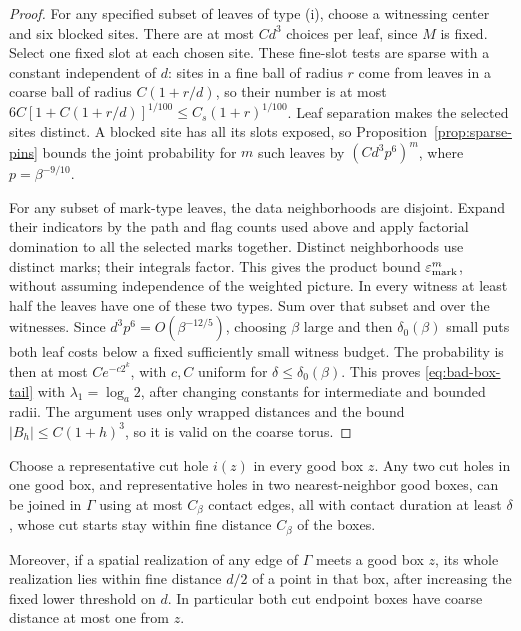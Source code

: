 \begin{proof}
For any specified subset of leaves of type (i), choose a witnessing
center and six blocked sites.  There are at most $Cd^3$ choices per
leaf, since $M$ is fixed.  Select one fixed slot at each chosen
site.  These fine-slot tests are sparse with a constant independent
of $d$: sites in a fine ball of radius $r$ come from leaves in a
coarse ball of radius $C(1+r/d)$, so their number is at most
$6C[1+C(1+r/d)]^{1/100}\le C_s(1+r)^{1/100}$.
Leaf separation makes the selected sites distinct.  A blocked site
has all its slots exposed, so Proposition~\ref{prop:sparse-pins}
bounds the joint probability for $m$ such leaves by
$(Cd^3p^6)^m$, where $p=\beta^{-9/10}$.

For any subset of mark-type leaves, the data neighborhoods are
disjoint.  Expand their indicators by the path and flag counts
used above and apply factorial domination to all the selected marks
together.  Distinct neighborhoods use distinct marks; their
integrals factor.  This gives the product bound
$\varepsilon_{\rm mark}^m$, without assuming independence of the
weighted picture.  In every witness at least half the leaves have
one of these two types.  Sum over that subset and over the
witnesses.  Since $d^3p^6=O(\beta^{-12/5})$, choosing $\beta$
large and then $\delta_0(\beta)$ small puts both leaf costs below
a fixed sufficiently small witness budget.  The probability is then
at most $Ce^{-c2^k}$, with $c,C$ uniform for
$\delta\le\delta_0(\beta)$.  This proves \eqref{eq:bad-box-tail} with
$\lambda_1=\log_a2$, after changing constants for intermediate
and bounded radii.  The argument uses only wrapped distances and
the bound $|B_h|\le C(1+h)^3$, so it is valid on the coarse torus.
\end{proof}

\begin{lemma}\label{lem:good-box-paths}
Choose a representative cut hole $i(z)$ in every good box $z$.
Any two cut holes in one good box, and representative holes in two
nearest-neighbor good boxes, can be joined in $\Gamma$ using at
most $C_\beta$ contact edges, all with contact duration at least
$\delta$, whose cut starts stay within fine distance $C_\beta$
of the boxes.

Moreover, if a spatial realization of any edge of $\Gamma$ meets
a good box $z$, its whole realization lies within fine distance
$d/2$ of a point in that box, after increasing the fixed lower
threshold on $d$.  In particular both cut endpoint boxes have
coarse distance at most one from $z$.
\end{lemma}

